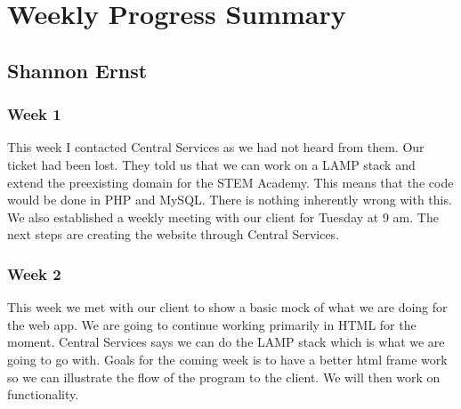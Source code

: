 \documentclass[letterpaper,10pt,serif, draftclsnofoot,onecolumn, compsoc, titlepage]{IEEEtran}
\begin{document}
\begin{comment}
\subsection{Week 5}
This week our group met up with our client and they provided feedback on the report generation page design and during the meeting Shannon drew an alternative query structure based on their feedback.
Javier will have to make some changes to the report generation page, so that the client is able to do the queries that they requested.
Our client also emailed us a follow up about the things they want to be able to query along with examples.
This week Shannon contacted Central Services to get a sub domain.
Both Shannon and Kyle worked on getting the PHP working for posting a JSON object to the database table.
However, they ran into a problem where the POST data was coming back empty in the PHP code and were unable to find the issue causing it.
The plans that our group has for the upcoming week is to make revisions to our documents, create the progress report document, record the demo video, work on the capstone project, and to solve the issue with the POST data of a JSON object. 

\subsection{Week 6} 
\end{comment}

\section{Weekly Progress Summary}
\subsection{Shannon Ernst}
\subsubsection{Week 1}
This week I contacted Central Services as we had not heard from them.
Our ticket had been lost.
They told us that we can work on a LAMP stack and extend the preexisting domain for the STEM Academy.
This means that the code would be done in PHP and MySQL.
There is nothing inherently wrong with this.
We also established a weekly meeting with our client for Tuesday at 9 am.
The next steps are creating the website through Central Services.
\subsubsection{Week 2}
This week we met with our client to show a basic mock of what we are doing for the web app.
We are going to continue working primarily in HTML for the moment.
Central Services says we can do the LAMP stack which is what we are going to go with.
Goals for the coming week is to have a better html frame work so we can illustrate the flow of the program to the client.
We will then work on functionality.
\end{document}
